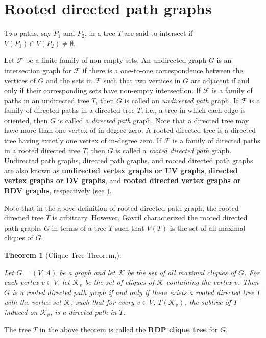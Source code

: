 \documentclass[a4paper,12pt]{article}
\theoremstyle{plain}
\newtheorem{theorem}{Theorem}[section]
\theoremstyle{definition}
\theoremstyle{remark}
\begin{document}
\section{Rooted directed path graphs}

Two paths, say $P_1$ and $P_2$, in a tree $T$ are said to intersect
if $V(P_1) \cap V(P_2) \neq \emptyset$.

Let $\mathscr{F}$ be a finite family of non-empty sets. An
undirected graph $G$ is an intersection graph for $\mathscr{F}$ if
there is a one-to-one correspondence between the vertices of $G$ and
the sets in $\mathscr{F}$ such that two vertices in $G$ are adjacent
 if and only if their corresponding sets have non-empty intersection.
 If $\mathscr{F}$ is a family of paths in an undirected tree $T$,
then $G$ is called an {\it undirected path} graph. If $\mathscr{F}$
is a family of directed paths in a directed tree $T$, i.e., a tree
in which each edge is oriented, then $G$ is called a {\it directed
path} graph. Note that a directed tree may have more than one vertex
of in-degree zero. A rooted directed tree is a directed tree having
exactly one vertex of in-degree zero. If $\mathscr{F}$ is a family
of directed paths in a rooted directed tree $T$, then $G$ is called
a {\it rooted directed path} graph. Undirected path graphs, directed
path graphs, and rooted directed path graphs are also known as {\bf
undirected vertex graphs or UV graphs}, {\bf directed vertex graphs
or DV graphs}, and {\bf rooted directed vertex graphs or RDV
graphs}, respectively (see \cite{monma}).



Note that in the above definition of rooted directed path graph, the
rooted directed tree $T$ is arbitrary. However, Gavril \cite{gav}
characterized the rooted directed path graphs $G$ in terms of a tree
$T$ such that $V(T)$ is the set of all maximal cliques of $G$.

\begin{theorem}[Clique Tree Theorem,\cite{gav,monma}]\label{ctt}

Let $G=(V,A)$ be a graph and let $\mathscr{K}$ be the set of all
maximal cliques of $G$. For each vertex $v\in V$, let
$\mathscr{K}_v$ be the set of cliques of $\mathscr{K}$ containing
the vertex $v$. Then $G$ is a rooted directed path graph if and only
if there exists a rooted directed tree $T$ with the vertex set
$\mathscr{K}$, such that for every $v\in V$, $T(\mathscr{K}_v)$, the
subtree of $T$ induced on $\mathscr{K}_v$, is a directed path in
$T$.



\end{theorem}
The tree $T$ in the above theorem is called the {\bf RDP clique
tree} for $G$.
\end{document}
